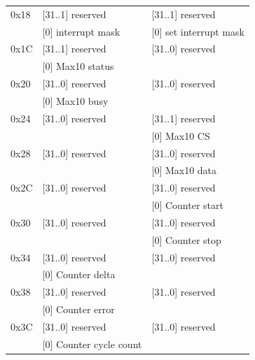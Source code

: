 \documentclass[a4paper,12pt]{article}
\begin{document}
\begin{longtable}{|p{4cm}|p{5cm}|p{6cm}|}
    \hline
    0x18                      & [31..1] reserved          & [31..1] reserved       \\
                              & [0] interrupt mask        & [0] set interrupt mask \\
    \hline
    0x1C                      & [31..1] reserved          & [31..0] reserved       \\
                              & [0] Max10 status          &                        \\
    \hline
    0x20                      & [31..0] reserved          & [31..0] reserved       \\
                              & [0] Max10 busy            &                        \\
    \hline
    0x24                      & [31..0] reserved          & [31..1] reserved       \\
                              &                           & [0] Max10 CS           \\
    \hline
    0x28                      & [31..0] reserved          & [31..0] reserved       \\
                              &                           & [0] Max10 data         \\
    \hline
    0x2C                      & [31..0] reserved          & [31..0] reserved       \\
                              &                           & [0] Counter start      \\
    \hline
    0x30                      & [31..0] reserved          & [31..0] reserved       \\
                              &                           & [0] Counter stop       \\
    \hline
    0x34                      & [31..0] reserved          & [31..0] reserved       \\
                              & [0] Counter delta         &                        \\
    \hline
    0x38                      & [31..0] reserved          & [31..0] reserved       \\
                              & [0] Counter error         &                        \\
    \hline
    0x3C                      & [31..0] reserved          & [31..0] reserved       \\
                              & [0] Counter cycle count   &                        \\
    \hline
\end{longtable}
\end{document}

